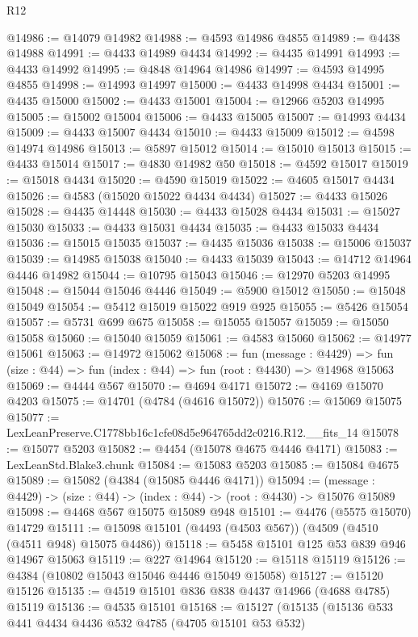 \begin{lexlean}{R12}
\begin{coremodule}
@14986 := @14079 @14982
@14988 := @4593 @14986 @4855
@14989 := @4438 @14988
@14991 := @4433 @14989 @4434
@14992 := @4435 @14991
@14993 := @4433 @14992
@14995 := @4848 @14964 @14986
@14997 := @4593 @14995 @4855
@14998 := @14993 @14997
@15000 := @4433 @14998 @4434
@15001 := @4435 @15000
@15002 := @4433 @15001
@15004 := @12966 @5203 @14995
@15005 := @15002 @15004
@15006 := @4433 @15005
@15007 := @14993 @4434
@15009 := @4433 @15007 @4434
@15010 := @4433 @15009
@15012 := @4598 @14974 @14986
@15013 := @5897 @15012
@15014 := @15010 @15013
@15015 := @4433 @15014
@15017 := @4830 @14982 @50
@15018 := @4592 @15017
@15019 := @15018 @4434
@15020 := @4590 @15019
@15022 := @4605 @15017 @4434
@15026 := @4583 (@15020 @15022 @4434 @4434)
@15027 := @4433 @15026
@15028 := @4435 @14448
@15030 := @4433 @15028 @4434
@15031 := @15027 @15030
@15033 := @4433 @15031 @4434
@15035 := @4433 @15033 @4434
@15036 := @15015 @15035
@15037 := @4435 @15036
@15038 := @15006 @15037
@15039 := @14985 @15038
@15040 := @4433 @15039
@15043 := @14712 @14964 @4446 @14982
@15044 := @10795 @15043
@15046 := @12970 @5203 @14995
@15048 := @15044 @15046 @4446
@15049 := @5900 @15012
@15050 := @15048 @15049
@15054 := @5412 @15019 @15022 @919 @925
@15055 := @5426 @15054
@15057 := @5731 @699 @675
@15058 := @15055 @15057
@15059 := @15050 @15058
@15060 := @15040 @15059
@15061 := @4583 @15060
@15062 := @14977 @15061
@15063 := @14972 @15062
@15068 := fun (message : @4429) =>
  fun (size : @44) => fun (index : @44) => fun (root : @4430) => @14968 @15063
@15069 := @4444 @567
@15070 := @4694 @4171
@15072 := @4169 @15070 @4203
@15075 := @14701 (@4784 (@4616 @15072))
@15076 := @15069 @15075
@15077 := LexLeanPreserve.C1778bb16c1cfe08d5e964765dd2c0216.R12.__fits_14
@15078 := @15077 @5203
@15082 := @4454 (@15078 @4675 @4446 @4171)
@15083 := LexLeanStd.Blake3.chunk
@15084 := @15083 @5203
@15085 := @15084 @4675
@15089 := @15082 (@4384 (@15085 @4446 @4171))
@15094 := (message : @4429) -> (size : @44) -> (index : @44) -> (root : @4430) -> @15076 @15089
@15098 := @4468 @567 @15075 @15089 @948
@15101 := @4476 (@5575 @15070) @14729
@15111 := @15098 @15101 (@4493 (@4503 @567)) (@4509 (@4510 (@4511 @948) @15075 @4486))
@15118 := @5458 @15101 @125 @53 @839 @946 @14967 @15063
@15119 := @227 @14964
@15120 := @15118 @15119
@15126 := @4384 (@10802 @15043 @15046 @4446 @15049 @15058)
@15127 := @15120 @15126
@15135 := @4519 @15101 @836 @838 @4437 @14966 (@4688 @4785) @15119
@15136 := @4535 @15101
@15168 := @15127
    (@15135
      (@15136
        @533
        @441
        @4434
        @4436
        @532
        @4785
        (@4705 @15101 @53 @532)

\end{coremodule}
\end{lexlean}
